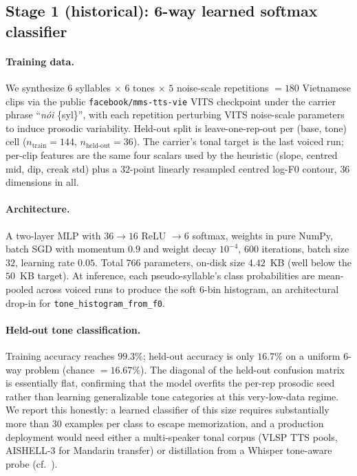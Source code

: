 \documentclass[a4paper,fleqn]{cas-dc}
\begin{document}
\subsection{Stage 1 (historical): 6-way learned softmax classifier}\label{app:learnedtone:stage1}

\paragraph{Training data.} We synthesize $6$ syllables $\times$ $6$ tones $\times$ $5$ noise-scale repetitions $= 180$ Vietnamese clips via the public \texttt{facebook/mms-tts-vie} VITS checkpoint under the carrier phrase ``\emph{n\'oi} \{syl\}'', with each repetition perturbing VITS noise-scale parameters to induce prosodic variability. Held-out split is leave-one-rep-out per (base, tone) cell ($n_\text{train} = 144$, $n_\text{held-out} = 36$). The carrier's tonal target is the last voiced run; per-clip features are the same four scalars used by the heuristic (slope, centred mid, dip, creak std) plus a $32$-point linearly resampled centred log-F0 contour, $36$ dimensions in all.

\paragraph{Architecture.} A two-layer MLP with $36 \to 16$ ReLU $\to 6$ softmax, weights in pure NumPy, batch SGD with momentum $0.9$ and weight decay $10^{-4}$, $600$ iterations, batch size $32$, learning rate $0.05$. Total $766$ parameters, on-disk size $\mathbf{4.42}$~KB (well below the $50$~KB target). At inference, each pseudo-syllable's class probabilities are mean-pooled across voiced runs to produce the soft 6-bin histogram, an architectural drop-in for \texttt{tone\_histogram\_from\_f0}.

\paragraph{Held-out tone classification.} Training accuracy reaches $99.3\%$; held-out accuracy is only $16.7\%$ on a uniform $6$-way problem (chance $= 16.67\%$). The diagonal of the held-out confusion matrix is essentially flat, confirming that the model overfits the per-rep prosodic seed rather than learning generalizable tone categories at this very-low-data regime. We report this honestly: a learned classifier of this size requires substantially more than $30$ examples per class to escape memorization, and a production deployment would need either a multi-speaker tonal corpus (VLSP TTS pools, AISHELL-3 for Mandarin transfer) or distillation from a Whisper tone-aware probe (cf.~\citet{delafuente2024tone}).
\end{document}
